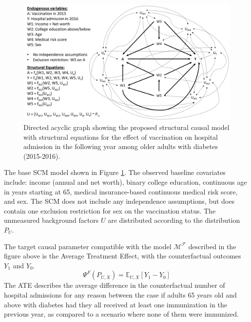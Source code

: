 \documentclass[english, 12pt]{article}
\def\E{\mathbb{E}}
\begin{document}
\begin{figure}[H]
    \centering
    \includegraphics[scale=0.45]{figures/DAG.PNG}
    \caption{Directed acyclic graph showing the proposed structural causal model with structural equations for the effect of vaccination on hospital admission in the following year among older adults with diabetes (2015-2016).}
    \label{fig:DAG_original}
\end{figure}

The base SCM model shown in Figure \ref{fig:DAG_original}. The observed baseline covariates include: income (annual and net worth), binary college education, continuous age in years starting at 65, medical insurance-based continuous medical risk score, and sex. The SCM does not include any independence assumptions, but does contain one exclusion restriction for sex on the vaccination status. The unmeasured background factors $U$ are distributed according to the distribution $P_U$.

The target causal parameter compatible with the model $\mathcal{M}^{\mathcal{F}}$ described in the figure above is the Average Treatment Effect, with the counterfactual outcomes $Y_{1}$ and $Y_{0}$. $$\Psi^F(P_{U,X}) = \E_{U,X}[Y_1-Y_0]$$ The ATE describes the average difference in the counterfactual number of hospital admissions for any reason between the case if adults 65 years old and above with diabetes had they all received at least one immunization in the previous year, as compared to a scenario where none of them were immunized.
\end{document}

